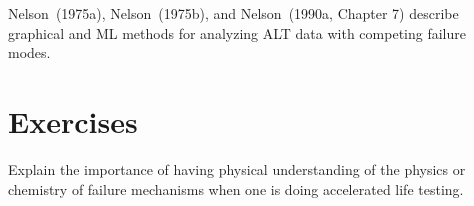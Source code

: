 Nelson~(1975a), Nelson~(1975b), and Nelson~(1990a, Chapter 7) describe
graphical and ML methods for analyzing ALT data with competing failure
modes.

\section*{Exercises}

\begin{exercise}
Explain the importance of having physical understanding of the physics
or chemistry of failure mechanisms when one is doing accelerated life
testing.
\end{exercise}

